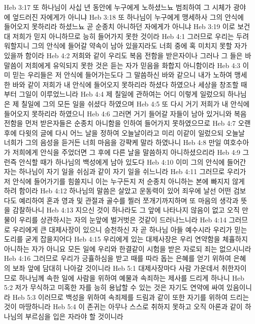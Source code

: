 Heb 3:17  또 하나님이 사십 년 동안에 누구에게 노하셨느뇨 범죄하여 그 시체가 광야에 엎드러진 자에게가 아니냐
Heb 3:18  또 하나님이 누구에게 맹세하사 그의 안식에 들어오지 못하리라 하셨느뇨 곧 순종치 아니하던 자에게가 아니냐
Heb 3:19  이로 보건대 저희가 믿지 아니하므로 능히 들어가지 못한 것이라
Heb 4:1  그러므로 우리는 두려워할지니 그의 안식에 들어갈 약속이 남아 있을지라도 너희 중에 혹 미치지 못할 자가 있을까 함이라
Heb 4:2  저희와 같이 우리도 복음 전함을 받은자이나 그러나 그 들은 바 말씀이 저희에게 유익되지 못한 것은 듣는 자가 믿음을 화합지 아니함이라
Heb 4:3  이미 믿는 우리들은 저 안식에 들어가는도다 그 말씀하신 바와 같으니 내가 노하여 맹세한 바와 같이 저희가 내 안식에 들어오지 못하리라 하셨다 하였으나 세상을 창조할 때부터 그일이 이루었느니라
Heb 4:4  제 칠일에 관하여는 어디 이렇게 일렀으되 하나님은 제 칠일에 그의 모든 일을 쉬셨다 하였으며
Heb 4:5  또 다시 거기 저희가 내 안식에 들어오지 못하리라 하였으니
Heb 4:6  그러면 거기 들어갈 자들이 남아 있거니와 복음 전함을 먼저 받은자들은 순종치 아니함을 인하여 들어가지 못하였으므로
Heb 4:7  오랜 후에 다윗의 글에 다시 어느 날을 정하여 오늘날이라고 미리 이같이 일렀으되 오늘날 너희가 그의 음성을 듣거든 너희 마음을 강퍅케 말라 하였나니
Heb 4:8  만일 여호수아가 저희에게 안식을 주었더면 그 후에 다른 날을 말씀하지 아니하셨으리라
Heb 4:9  그런즉 안식할 때가 하나님의 백성에게 남아 있도다
Heb 4:10  이미 그의 안식에 들어간 자는 하나님이 자기 일을 쉬심과 같이 자기 일을 쉬느니라
Heb 4:11  그러므로 우리가 저 안식에 들어가기를 힘쓸지니 이는 누구든지 저 순종치 아니하는 본에 빠지지 않게 하려 함이라
Heb 4:12  하나님의 말씀은 살았고 운동력이 있어 죄우에 날선 어떤 검보다도 예리하여 혼과 영과 및 관절과 골수를 찔러 쪼개기까지하며 또 마음의 생각과 뜻을 감찰하나니
Heb 4:13  지으신 것이 하나라도 그 앞에 나타나지 않음이 없고 오직 만물이 우리를 상관하시는 자의 눈앞에 벌거벗은 것같이 드러나느니라
Heb 4:14  그러므로 우리에게 큰 대제사장이 있으니 승천하신 자 곧 하나님 아들 예수시라 우리가 믿는 도리를 굳게 잡을지어다
Heb 4:15  우리에게 있는 대제사장은 우리 연약함을 체휼하지 아니하는 자가 아니요 모든 일에 우리와 한결같이 시험을 받은 자로되 죄는 없으시니라
Heb 4:16  그러므로 우리가 긍휼하심을 받고 때를 따라 돕는 은혜를 얻기 위하여 은혜의 보좌 앞에 담대히 나아갈 것이니라
Heb 5:1  대제사장마다 사람 가운데서 취한자이므로 하나님께 속한 일에 사람을 위하여 예물과 속죄하는 제사를 드리게 하나니
Heb 5:2  저가 무식하고 미혹한 자를 능히 용납할 수 있는 것은 자기도 연약에 싸여 있음이니라
Heb 5:3  이러므로 백성을 위하여 속죄제를 드림과 같이 또한 자기를 위하여 드리는 것이 마땅하니라
Heb 5:4  이 존귀는 아무나 스스로 취하지 못하고 오직 아론과 같이 하나님의 부르심을 입은 자라야 할 것이니라
